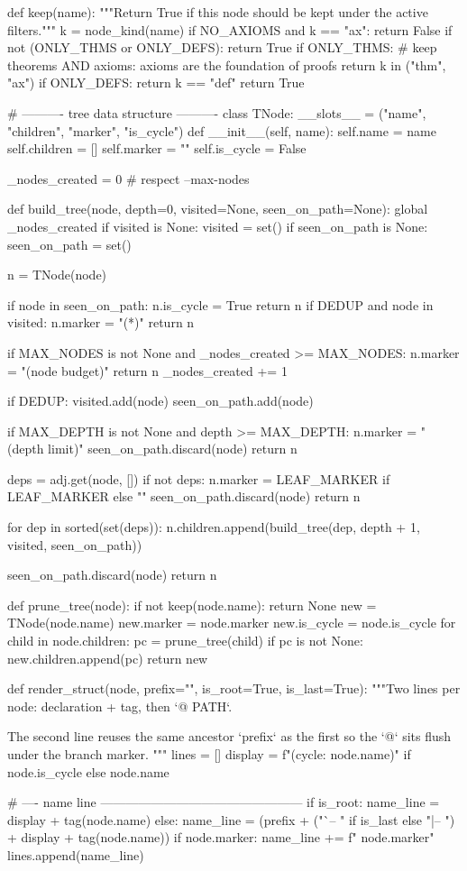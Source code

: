 \documentclass[11pt,reqno]{amsart}
\begin{document}
\begin{verbatimbox}
def keep(name):
"""Return True if this node should be kept under the active filters."""
k = node_kind(name)
if NO_AXIOMS and k == "ax":
return False
if not (ONLY_THMS or ONLY_DEFS):
return True
if ONLY_THMS:
# keep theorems AND axioms: axioms are the foundation of proofs
return k in ("thm", "ax")
if ONLY_DEFS:
return k == "def"
return True

# ---------- tree data structure ----------
class TNode:
__slots__ = ("name", "children", "marker", "is_cycle")
def __init__(self, name):
self.name = name
self.children = []
self.marker = ""
self.is_cycle = False

_nodes_created = 0  # respect --max-nodes

def build_tree(node, depth=0, visited=None, seen_on_path=None):
global _nodes_created
if visited is None:
visited = set()
if seen_on_path is None:
seen_on_path = set()

n = TNode(node)

if node in seen_on_path:
n.is_cycle = True
return n
if DEDUP and node in visited:
n.marker = "(*)"
return n

if MAX_NODES is not None and _nodes_created >= MAX_NODES:
n.marker = "(node budget)"
return n
_nodes_created += 1

if DEDUP:
visited.add(node)
seen_on_path.add(node)

if MAX_DEPTH is not None and depth >= MAX_DEPTH:
n.marker = "(depth limit)"
seen_on_path.discard(node)
return n

deps = adj.get(node, [])
if not deps:
n.marker = LEAF_MARKER if LEAF_MARKER else ""
seen_on_path.discard(node)
return n

for dep in sorted(set(deps)):
n.children.append(build_tree(dep, depth + 1, visited, seen_on_path))

seen_on_path.discard(node)
return n

def prune_tree(node):
if not keep(node.name):
return None
new = TNode(node.name)
new.marker = node.marker
new.is_cycle = node.is_cycle
for child in node.children:
pc = prune_tree(child)
if pc is not None:
new.children.append(pc)
return new

def render_struct(node, prefix="", is_root=True, is_last=True):
"""Two lines per node: declaration + tag, then `@ PATH`.

The second line reuses the same ancestor `prefix` as the first
so the `@` sits flush under the branch marker.
"""
lines = []
display = f"(cycle: {node.name})" if node.is_cycle else node.name

# ---- name line ------------------------------------------------
if is_root:
name_line = display + tag(node.name)
else:
name_line = (prefix
+ ("`-- " if is_last else "|-- ")
+ display
+ tag(node.name))
if node.marker:
name_line += f"   {node.marker}"
lines.append(name_line)


\end{verbatimbox}
\end{document}
